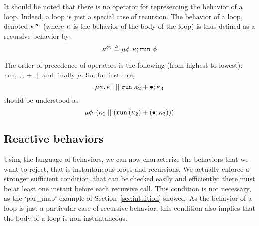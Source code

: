 \documentclass[9pt,preprint]{sigplanconf}
\newcommand{\deq}{\triangleq}
\begin{document}
It should be noted that there is no operator for representing the behavior of a loop. Indeed, a loop is just a special case of recursion. The behavior of a loop, denoted $\kappa^\infty$ (where $\kappa$ is the behavior of the body of the loop) is thus defined as a recursive behavior by:
\[\effinf{\rk} \deq \effrec{\effvar}{\effcon{\rk}{\effrun{\effvar}}} \]

The order of precedence of operators is the following (from highest to lowest): $\mathtt{run}$, $;$, $+$, $||$ and finally $\mu$. So, for instance, 
\[ \mu \phi.\, \kappa_1 \mid\mid \mathtt{run}\; \kappa_2 + \bullet ; \kappa_3 \] 
should be understood as 
\[ \mu \phi.\, (\kappa_1 \mid\mid (\mathtt{run}\; (\kappa_2) + (\bullet ; \kappa_3))) \]


%
%
%
%
%


\subsection{Reactive behaviors}
\label{sec:reactive_behavior}

Using the language of behaviors, we can now characterize the behaviors that we want to reject, that is instantaneous loops and recursions. We actually enforce a stronger sufficient condition, that can be checked easily and efficiently: there must be at least one instant before each recursive call. This condition is not necessary, as the `par_map` example of Section~\ref{sec:intuition} showed. As the behavior of a loop is just a particular case of recursive behavior, this condition also implies that the body of a loop is non-instantaneous.
\end{document}
